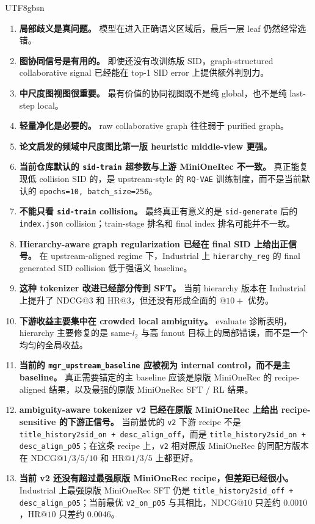 \documentclass[11pt]{article}
\begin{document}
\begin{CJK*}{UTF8}{gbsn}
\begin{enumerate}
  \item \textbf{局部歧义是真问题。} 模型在进入正确语义区域后，最后一层 leaf 仍然经常选错。
  \item \textbf{图协同信号是有用的。} 即使还没有改训练版 SID，graph-structured collaborative signal 已经能在 top-1 SID error 上提供额外判别力。
  \item \textbf{中尺度图视图很重要。} 最有价值的协同视图既不是纯 global，也不是纯 last-step local。
  \item \textbf{轻量净化是必要的。} raw collaborative graph 往往弱于 purified graph。
  \item \textbf{论文启发的频域中尺度图比第一版 heuristic middle-view 更强。}
  \item \textbf{当前仓库默认的 \texttt{sid-train} 超参数与上游 MiniOneRec 不一致。} 真正能复现低 collision SID 的，是 upstream-style 的 \texttt{RQ-VAE} 训练制度，而不是当前默认的 \texttt{epochs=10, batch\_size=256}。
  \item \textbf{不能只看 \texttt{sid-train} collision。} 最终真正有意义的是 \texttt{sid-generate} 后的 \texttt{index.json} collision；train-stage 排名和 final index 排名可能并不一致。
  \item \textbf{Hierarchy-aware graph regularization 已经在 final SID 上给出正信号。} 在 upstream-aligned regime 下，Industrial 上 \texttt{hierarchy\_reg} 的 final generated SID collision 低于强语义 baseline。
  \item \textbf{这种 tokenizer 改进已经部分传到 SFT。} 当前 hierarchy 版本在 Industrial 上提升了 \(\mathrm{NDCG}@3\) 和 \(\mathrm{HR}@3\)，但还没有形成全面的 \( @10+ \) 优势。
  \item \textbf{下游收益主要集中在 crowded local ambiguity。} evaluate 诊断表明，hierarchy 主要修复的是 same-\(l_2\) 与高 fanout 目标上的局部错误，而不是一个均匀的全局收益。
  \item \textbf{当前的 \texttt{mgr\_upstream\_baseline} 应被视为 internal control，而不是主 baseline。} 真正需要锚定的主 baseline 应该是原版 MiniOneRec 的 recipe-aligned 结果，以及最强的原版 MiniOneRec SFT / RL 结果。
  \item \textbf{ambiguity-aware tokenizer v2 已经在原版 MiniOneRec 上给出 recipe-sensitive 的下游正信号。} 当前最优的 \texttt{v2} 下游 recipe 不是 \texttt{title\_history2sid\_on + desc\_align\_off}，而是 \texttt{title\_history2sid\_on + desc\_align\_p05}；在这条 recipe 上，\texttt{v2} 相对原版 MiniOneRec 的同配方版本在 \(\mathrm{NDCG}@1/3/5/10\) 和 \(\mathrm{HR}@1/3/5\) 上都更好。
  \item \textbf{当前 v2 还没有超过最强原版 MiniOneRec recipe，但差距已经很小。} Industrial 上最强原版 MiniOneRec SFT 仍是 \texttt{title\_history2sid\_off + desc\_align\_p05}；当前最优 \texttt{v2\_on\_p05} 与其相比，\(\mathrm{NDCG}@10\) 只差约 \(0.0010\)，\(\mathrm{HR}@10\) 只差约 \(0.0046\)。

\end{enumerate}
\end{CJK*}
\end{document}
